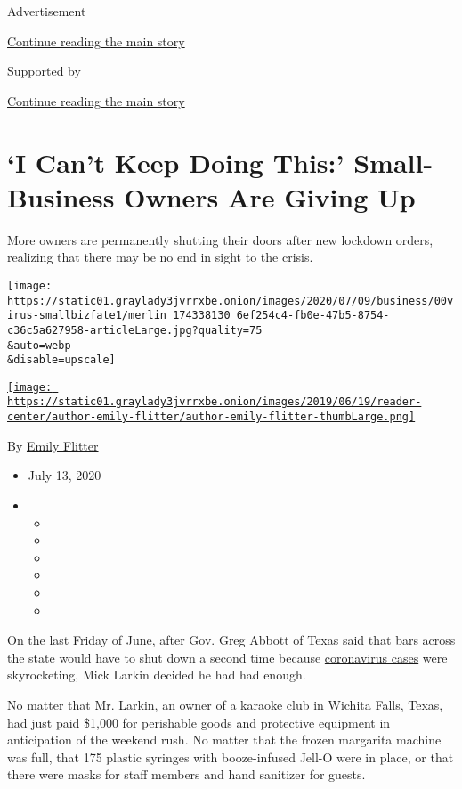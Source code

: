 Advertisement

\protect\hyperlink{after-top}{Continue reading the main story}

Supported by

\protect\hyperlink{after-sponsor}{Continue reading the main story}

\hypertarget{i-cant-keep-doing-this-small-business-owners-are-giving-up}{%
\section{`I Can't Keep Doing This:' Small-Business Owners Are Giving
Up}\label{i-cant-keep-doing-this-small-business-owners-are-giving-up}}

More owners are permanently shutting their doors after new lockdown
orders, realizing that there may be no end in sight to the crisis.

\texttt{[image: https://static01.graylady3jvrrxbe.onion/images/2020/07/09/business/00virus-smallbizfate1/merlin\_174338130\_6ef254c4-fb0e-47b5-8754-c36c5a627958-articleLarge.jpg?quality=75\\\&auto=webp\\\&disable=upscale]}

\href{https://www.nytimes3xbfgragh.onion/by/emily-flitter}{\texttt{[image: https://static01.graylady3jvrrxbe.onion/images/2019/06/19/reader-center/author-emily-flitter/author-emily-flitter-thumbLarge.png]}}

By \href{https://www.nytimes3xbfgragh.onion/by/emily-flitter}{Emily
Flitter}

\begin{itemize}
\item
  July 13, 2020
\item
  \begin{itemize}
  \item
  \item
  \item
  \item
  \item
  \item
  \end{itemize}
\end{itemize}

On the last Friday of June, after Gov. Greg Abbott of Texas said that
bars across the state would have to shut down a second time because
\href{https://www.nytimes3xbfgragh.onion/news-event/coronavirus}{coronavirus
cases} were skyrocketing, Mick Larkin decided he had had enough.

No matter that Mr. Larkin, an owner of a karaoke club in Wichita Falls,
Texas, had just paid \$1,000 for perishable goods and protective
equipment in anticipation of the weekend rush. No matter that the frozen
margarita machine was full, that 175 plastic syringes with booze-infused
Jell-O were in place, or that there were masks for staff members and
hand sanitizer for guests.

